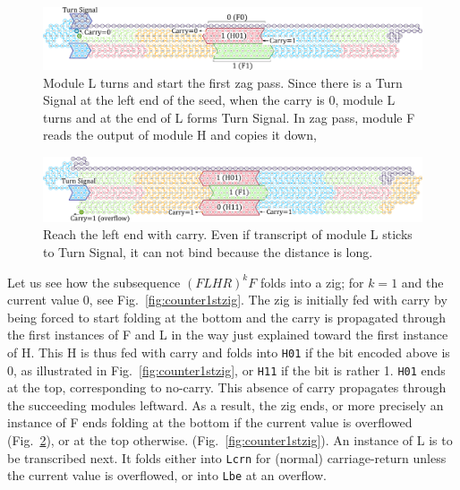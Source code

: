 \documentclass[runningheads]{llncs}
\begin{document}
\begin{figure}[tb]
\centering
\includegraphics[width=\linewidth]{fig/svg/CounterEx11_1.pdf}
\caption{
Module L turns and start the first zag pass.
Since there is a Turn Signal at the left end of the seed, when the carry is 0, module L turns and at the end of L forms Turn Signal.
In zag pass, module F reads the output of module H and copies it down,
}
\label{fig:counter1stzag}
\end{figure}

\begin{figure}[tb]
\centering
\includegraphics[width=\linewidth]{fig/svg/CounterEx13_1.pdf}
\caption{
Reach the left end with carry.
Even if transcript of module L sticks to Turn Signal, it can not bind because the distance is long.
}
\label{fig:overflowex1}
\end{figure}

Let us see how the subsequence $(FLHR)^kF$ folds into a zig; for $k=1$ and the current value 0, see Fig.~\ref{fig:counter1stzig}.
The zig is initially fed with carry by being forced to start folding at the bottom and the carry is propagated through the first instances of F and L in the way just explained toward the first instance of H.
This H is thus fed with carry and folds into \texttt{H01} if the bit encoded above is 0, as illustrated in Fig.~\ref{fig:counter1stzig}, or \texttt{H11} if the bit is rather 1.
\texttt{H01} ends at the top, corresponding to no-carry.
This absence of carry propagates through the succeeding modules leftward.
As a result, the zig ends, or more precisely an instance of F ends folding at the bottom if the current value is overflowed (Fig.~\ref{fig:overflowex1}), or at the top otherwise. (Fig.~\ref{fig:counter1stzig}).
An instance of L is to be transcribed next.
It folds either into \texttt{Lcrn} for (normal) carriage-return unless the current value is overflowed, or into \texttt{Lbe} at an overflow.
\end{document}
